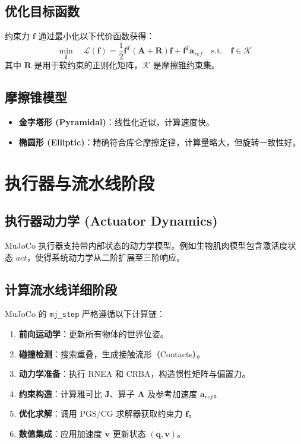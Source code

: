 \documentclass[11pt,a4paper]{book}
\begin{document}
\subsection{优化目标函数}
约束力 $\bm{f}$ 通过最小化以下代价函数获得：
\begin{equation}
\min_{\bm{f}} \quad \mathcal{L}(\bm{f}) = \frac{1}{2} \bm{f}^T (\bm{A} + \bm{R}) \bm{f} + \bm{f}^T \bm{a}_{ref} \quad \text{s.t.} \quad \bm{f} \in \mathcal{K}
\end{equation}
其中 $\bm{R}$ 是用于软约束的正则化矩阵，$\mathcal{K}$ 是摩擦锥约束集。

\subsection{摩擦锥模型}
\begin{itemize}
    \item \textbf{金字塔形 (Pyramidal)}：线性化近似，计算速度快。
    \item \textbf{椭圆形 (Elliptic)}：精确符合库仑摩擦定律，计算量略大，但旋转一致性好。
\end{itemize}



\section{执行器与流水线阶段}

\subsection{执行器动力学 (Actuator Dynamics)}
MuJoCo 执行器支持带内部状态的动力学模型。例如生物肌肉模型包含激活度状态 $act$，使得系统动力学从二阶扩展至三阶响应。

\subsection{计算流水线详细阶段}
MuJoCo 的 \texttt{mj\_step} 严格遵循以下计算链：

\begin{tcolorbox}[colback=gray!5, colframe=blue, title=mj\_step 执行管线]
\begin{enumerate}
    \item \textbf{前向运动学}：更新所有物体的世界位姿。
    \item \textbf{碰撞检测}：搜索重叠，生成接触流形（Contacts）。
    \item \textbf{动力学准备}：执行 RNEA 和 CRBA，构造惯性矩阵与偏置力。
    \item \textbf{约束构造}：计算雅可比 $\bm{J}$、算子 $\bm{A}$ 及参考加速度 $\bm{a}_{ref}$。
    \item \textbf{优化求解}：调用 PGS/CG 求解器获取约束力 $\bm{f}$。
    \item \textbf{数值集成}：应用加速度 $\dot{\bm{v}}$ 更新状态 $(\bm{q}, \bm{v})$。
\end{enumerate}
\end{tcolorbox}
\end{document}
